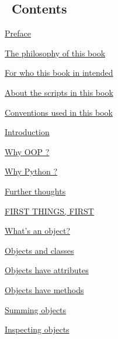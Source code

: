 \documentclass[10pt,english]{article}
\begin{document}
\subsection*{~\hfill Contents\hfill ~}
\begin{list}{}{}
\item {} \href{\#preface}{Preface}
\begin{list}{}{}
\item {} \href{\#the-philosophy-of-this-book}{The philosophy of this book}

\item {} \href{\#for-who-this-book-in-intended}{For who this book in intended}

\item {} \href{\#about-the-scripts-in-this-book}{About the scripts in this book}

\item {} \href{\#conventions-used-in-this-book}{Conventions used in this book}

\end{list}

\item {} \href{\#introduction}{Introduction}
\begin{list}{}{}
\item {} \href{\#why-oop}{Why OOP ?}

\item {} \href{\#why-python}{Why Python ?}

\item {} \href{\#further-thoughts}{Further thoughts}

\end{list}

\item {} \href{\#first-things-first}{FIRST THINGS, FIRST}
\begin{list}{}{}
\item {} \href{\#what-s-an-object}{What's an object?}

\item {} \href{\#objects-and-classes}{Objects and classes}

\item {} \href{\#objects-have-attributes}{Objects have attributes}

\item {} \href{\#objects-have-methods}{Objects have methods}

\item {} \href{\#summing-objects}{Summing objects}

\item {} \href{\#inspecting-objects}{Inspecting objects}


\end{list}
\end{list}
\end{document}
